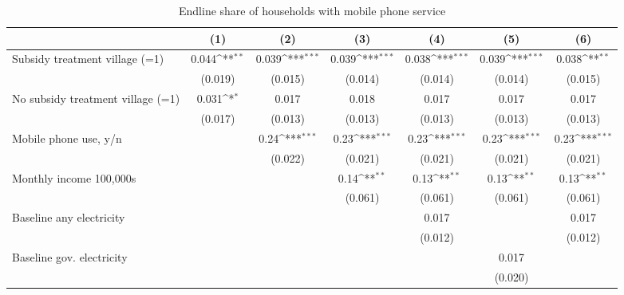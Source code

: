 \begin{table}[htbp]\centering
\def\sym#1{\ifmmode^{#1}\else\(^{#1}\)\fi}
\caption{Endline share of households with mobile phone service}
\begin{tabular*}{1\hsize}{@{\hskip\tabcolsep\extracolsep\fill}l*{6}{c}}
\toprule
                &\multicolumn{1}{c}{(1)}         &\multicolumn{1}{c}{(2)}         &\multicolumn{1}{c}{(3)}         &\multicolumn{1}{c}{(4)}         &\multicolumn{1}{c}{(5)}         &\multicolumn{1}{c}{(6)}         \\
\midrule
Subsidy treatment village (=1)&    0.044\sym{**} &    0.039\sym{***}&    0.039\sym{***}&    0.038\sym{***}&    0.039\sym{***}&    0.038\sym{**} \\
                &  (0.019)         &  (0.015)         &  (0.014)         &  (0.014)         &  (0.014)         &  (0.015)         \\
No subsidy treatment village (=1)&    0.031\sym{*}  &    0.017         &    0.018         &    0.017         &    0.017         &    0.017         \\
                &  (0.017)         &  (0.013)         &  (0.013)         &  (0.013)         &  (0.013)         &  (0.013)         \\
Mobile phone use, y/n&                  &     0.24\sym{***}&     0.23\sym{***}&     0.23\sym{***}&     0.23\sym{***}&     0.23\sym{***}\\
                &                  &  (0.022)         &  (0.021)         &  (0.021)         &  (0.021)         &  (0.021)         \\
Monthly income 100,000s&                  &                  &     0.14\sym{**} &     0.13\sym{**} &     0.13\sym{**} &     0.13\sym{**} \\
                &                  &                  &  (0.061)         &  (0.061)         &  (0.061)         &  (0.061)         \\
Baseline any electricity&                  &                  &                  &    0.017         &                  &    0.017         \\
                &                  &                  &                  &  (0.012)         &                  &  (0.012)         \\
Baseline gov. electricity&                  &                  &                  &                  &    0.017         &                  \\
                &                  &                  &                  &                  &  (0.020)         &                  \\

\end{tabular*}
\end{table}

